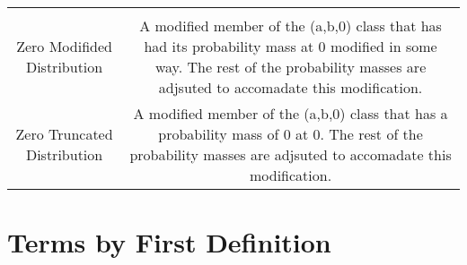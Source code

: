 \documentclass[]{book}
\theoremstyle{definition}
\theoremstyle{definition}
\theoremstyle{definition}
\theoremstyle{remark}
\begin{document}
\begin{longtable}[]{@{}cc@{}}
\begin{minipage}[t]{0.43\columnwidth}
\end{minipage}\tabularnewline
\begin{minipage}[t]{0.43\columnwidth}\centering\strut
Zero Modifided Distribution\strut
\end{minipage} & \begin{minipage}[t]{0.43\columnwidth}\centering\strut
A modified member of the (a,b,0) class that has had its probability mass
at 0 modified in some way. The rest of the probability masses are
adjsuted to accomadate this modification.\strut
\end{minipage}\tabularnewline
\begin{minipage}[t]{0.43\columnwidth}\centering\strut
Zero Truncated Distribution\strut
\end{minipage} & \begin{minipage}[t]{0.43\columnwidth}\centering\strut
A modified member of the (a,b,0) class that has a probability mass of 0
at 0. The rest of the probability masses are adjsuted to accomadate this
modification.\strut
\end{minipage}\tabularnewline
\bottomrule
\end{longtable}

\chapter{Terms by First Definition}\label{terms-by-first-definition}
\end{document}
